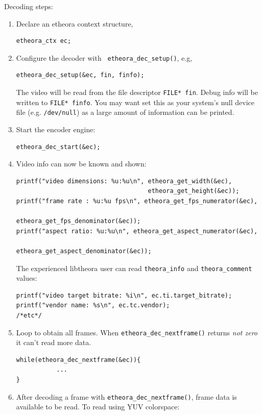 \documentclass{article}
\begin{document}
Decoding steps: 
\begin{enumerate}
\item Declare an etheora context structure, 

\begin{verbatim}
etheora_ctx ec;
\end{verbatim}

\item Configure the decoder with \texttt{ etheora\_dec\_setup()}, e.g, 
\begin{verbatim}
etheora_dec_setup(&ec, fin, finfo);
\end{verbatim}
The video will be read from the file descriptor 
\texttt{FILE* fin}. Debug info will be written to \texttt{FILE*
finfo}. You may want set this as your system's null device file (e.g.
\texttt{/dev/null}) as a large amount of information  can be printed. 

\item Start the encoder engine: 
\begin{verbatim}
etheora_dec_start(&ec); 
\end{verbatim}

\item Video info can now be known and shown: 

\begin{verbatim}
printf("video dimensions: %u:%u\n", etheora_get_width(&ec), 
                                    etheora_get_height(&ec));
printf("frame rate : %u:%u fps\n", etheora_get_fps_numerator(&ec), 
                                   etheora_get_fps_denominator(&ec));
printf("aspect ratio: %u:%u\n", etheora_get_aspect_numerator(&ec), 
                                etheora_get_aspect_denominator(&ec));
\end{verbatim}

The experienced libtheora user can read \texttt{theora\_info} and
\texttt{theora\_comment} values:
\begin{verbatim}
printf("video target bitrate: %i\n", ec.ti.target_bitrate); 
printf("vendor name: %s\n", ec.tc.vendor); 
/*etc*/
\end{verbatim}

\item Loop to obtain all frames. When \texttt{etheora\_dec\_nextframe()}
returns \textit{not zero} it can't read more data. 
\begin{verbatim}
while(etheora_dec_nextframe(&ec)){
           ...
}
\end{verbatim}

\item After decoding a frame with \texttt{etheora\_dec\_nextframe()},
frame data is available to be read. To read using YUV colorspace: 


\end{enumerate}
\end{document}
